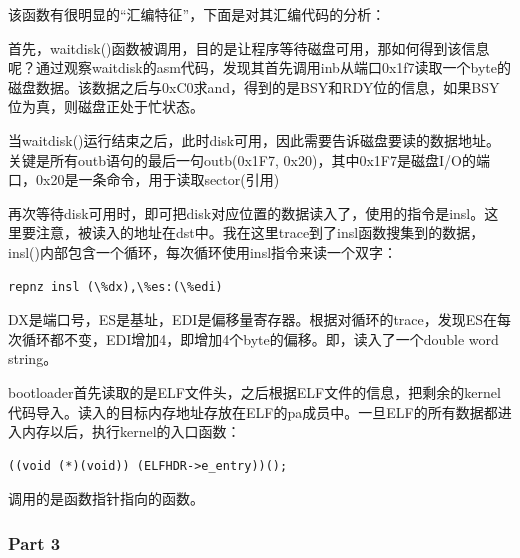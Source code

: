 该函数有很明显的“汇编特征”，下面是对其汇编代码的分析：

首先，waitdisk()函数被调用，目的是让程序等待磁盘可用，那如何得到该信息呢？通过观察waitdisk的asm代码，发现其首先调用inb从端口0x1f7读取一个byte的磁盘数据。该数据之后与0xC0求and，得到的是BSY和RDY位的信息，如果BSY位为真，则磁盘正处于忙状态。

当waitdisk()运行结束之后，此时disk可用，因此需要告诉磁盘要读的数据地址。关键是所有outb语句的最后一句outb(0x1F7, 0x20)，其中0x1F7是磁盘I/O的端口，0x20是一条命令，用于读取sector(引用)

再次等待disk可用时，即可把disk对应位置的数据读入了，使用的指令是insl。这里要注意，被读入的地址在dst中。我在这里trace到了insl函数搜集到的数据，insl()内部包含一个循环，每次循环使用insl指令来读一个双字：

\begin{lstlisting}[language={[x86masm]Assembler}]
repnz insl (\%dx),\%es:(\%edi)
\end{lstlisting}
DX是端口号，ES是基址，EDI是偏移量寄存器。根据对循环的trace，发现ES在每次循环都不变，EDI增加4，即增加4个byte的偏移。即，读入了一个double word string。

bootloader首先读取的是ELF文件头，之后根据ELF文件的信息，把剩余的kernel代码导入。读入的目标内存地址存放在ELF的pa成员中。一旦ELF的所有数据都进入内存以后，执行kernel的入口函数：\\

\begin{lstlisting}
((void (*)(void)) (ELFHDR->e_entry))();
\end{lstlisting}
调用的是函数指针指向的函数。

\subsubsection{Part 3}

